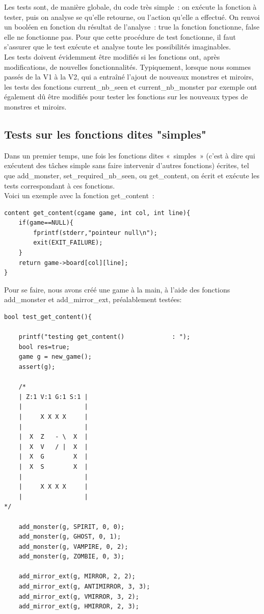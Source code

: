 \documentclass[12]{article}
\begin{document}
Les tests sont, de manière globale, du code très simple : on exécute la fonction à tester, puis on analyse se qu’elle retourne, ou l’action qu’elle a effectué. On renvoi un booléen en fonction du résultat de l’analyse : true la fonction fonctionne, false elle ne fonctionne pas. Pour que cette procédure de test fonctionne, il faut s’assurer que le test exécute et analyse toute les possibilités imaginables.\\ 

	Les tests doivent évidemment être modifiés si les fonctions ont, après modifications, de nouvelles fonctionnalités. Typiquement, lorsque nous sommes passés de la V1 à la V2, qui a entraîné l’ajout de nouveaux monstres et miroirs, les tests des fonctions current\_nb\_seen et current\_nb\_monster par exemple ont également dû être modifiés pour tester les fonctions sur les nouveaux types de monstres et miroirs.
\subsection{Tests sur les fonctions dites "simples"}
Dans un premier temps, une fois les fonctions dites « simples » (c’est à dire qui exécutent des tâches simple sans faire intervenir d’autres fonctions) écrites, tel que add\_monster, set\_required\_nb\_seen, ou get\_content,  on écrit et exécute les tests correspondant à ces fonctions.\\
	
Voici un exemple avec la fonction get\_content :
\begin{lstlisting}[style=CStyle]
content get_content(cgame game, int col, int line){
    if(game==NULL){
        fprintf(stderr,"pointeur null\n");
        exit(EXIT_FAILURE);
    }
    return game->board[col][line];
}
\end{lstlisting}

Pour se faire, nous avons créé une game à la main, à l’aide des fonctions add\_monster et add\_mirror\_ext, préalablement testées:

\begin{lstlisting}[style=CStyle]
bool test_get_content(){

    printf("testing get_content()             : ");
    bool res=true;
    game g = new_game();
    assert(g);

    /*
    | Z:1 V:1 G:1 S:1 |
    |                 |
    |     X X X X     |
    |                 |
    |  X  Z   - \  X  |
    |  X  V   / |  X  |
    |  X  G        X  |
    |  X  S        X  |
    |                 |
    |     X X X X     |
    |                 |
*/

    add_monster(g, SPIRIT, 0, 0);
    add_monster(g, GHOST, 0, 1);
    add_monster(g, VAMPIRE, 0, 2);
    add_monster(g, ZOMBIE, 0, 3);

    add_mirror_ext(g, MIRROR, 2, 2);
    add_mirror_ext(g, ANTIMIRROR, 3, 3);
    add_mirror_ext(g, VMIRROR, 3, 2);
    add_mirror_ext(g, HMIRROR, 2, 3);
\end{lstlisting}
\end{document}
